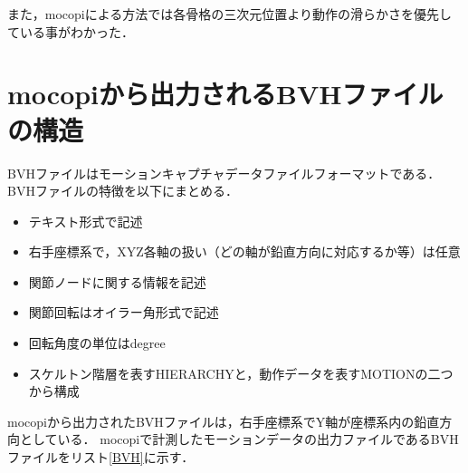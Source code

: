 \documentclass[a4j, fleqn, 12pt]{jsreport}
\begin{document}
また，mocopiによる方法では各骨格の三次元位置より動作の滑らかさを優先している事がわかった．



\begin{thebibliography}{99}
    \small{
    }
\end{thebibliography}

\appendix
\chapter{mocopiから出力されるBVHファイルの構造}
BVHファイルはモーションキャプチャデータファイルフォーマットである．
BVHファイルの特徴を以下にまとめる．
\begin{itemize}
    \item テキスト形式で記述
    \item 右手座標系で，XYZ各軸の扱い（どの軸が鉛直方向に対応するか等）は任意
    \item 関節ノードに関する情報を記述
    \item 関節回転はオイラー角形式で記述
    \item 回転角度の単位はdegree
    \item スケルトン階層を表すHIERARCHYと，動作データを表すMOTIONの二つから構成
\end{itemize}
mocopiから出力されたBVHファイルは，右手座標系でY軸が座標系内の鉛直方向としている．
mocopiで計測したモーションデータの出力ファイルであるBVHファイルをリスト\ref{BVH}に示す．
\end{document}
